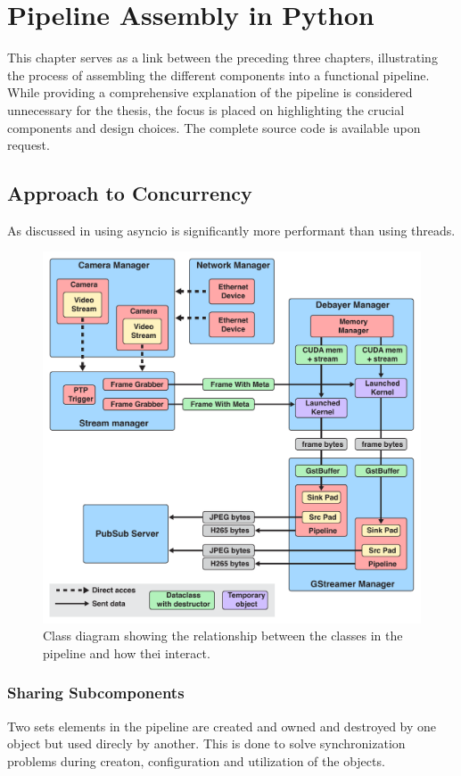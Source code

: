 
\chapter{Pipeline Assembly in Python}
\label{chap:pipeline}
This chapter serves as a link between the preceding three chapters, illustrating the process of assembling the different components into a functional pipeline.
While providing a comprehensive explanation of the pipeline is considered unnecessary for the thesis, the focus is placed on highlighting the crucial components and design choices.
The complete source code is available upon request.

\section{Approach to Concurrency}
As discussed in \todo using \gls{asyncio} is significantly more performant than using threads.


\begin{figure}
    \centering
    \includegraphics[width=\textwidth]{figures/object_overview.pdf}
    \caption{Class diagram showing the relationship between the classes in the pipeline and how thei interact.}
    \label{fig:pipeline_current}
\end{figure}

\subsection{Sharing Subcomponents}
Two sets elements in the pipeline are created and owned and destroyed by one object but used direcly by another.
This is done to solve synchronization problems during creaton, configuration and utilization of the objects.

